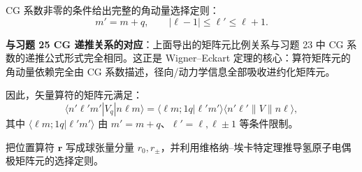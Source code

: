 \begin{solution}
	CG 系数非零的条件给出完整的角动量选择定则：
	\[
	m' = m+q,\qquad |\ell-1| \le \ell' \le \ell+1.
	\]

	\textbf{与习题 25 CG 递推关系的对应}：上面导出的矩阵元比例关系与习题 23 中 CG 系数的递推公式形式完全相同。这正是 Wigner--Eckart 定理的核心：算符矩阵元的角动量依赖完全由 CG 系数描述，径向/动力学信息全部吸收进约化矩阵元。

	因此，矢量算符的矩阵元满足：
	\[
	\boxed{\langle n'\ell'm'|V_q|n\ell m\rangle
	= \langle \ell m;1q|\ell'm'\rangle\langle n'\ell'\|V\|n\ell\rangle},
	\]
	其中 $\langle \ell m;1q|\ell'm'\rangle$ 由 $m'=m+q$、$\ell'=\ell,\ell\pm1$ 等条件限制。
	\end{solution}

\begin{question}
把位置算符 $\mathbf r$ 写成球张量分量 $r_0,r_\pm$，并利用维格纳--埃卡特定理推导氢原子电偶极矩阵元的选择定则。
\end{question}
